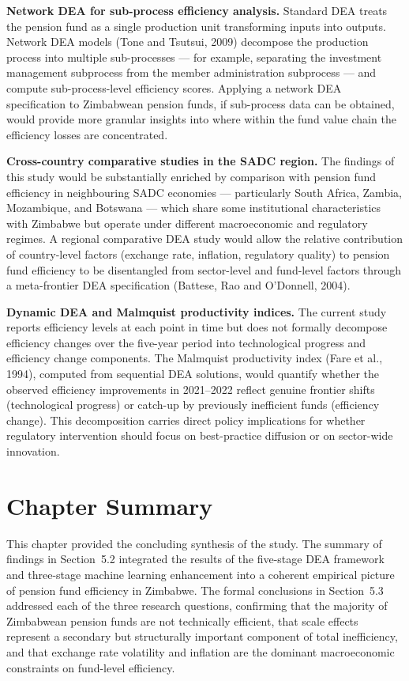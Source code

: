 \documentclass[12pt,a4paper]{article}
\begin{document}
\textbf{Network DEA for sub-process efficiency analysis.} Standard DEA treats the pension fund as a single production unit transforming inputs into outputs. Network DEA models (Tone and Tsutsui, 2009) decompose the production process into multiple sub-processes --- for example, separating the investment management subprocess from the member administration subprocess --- and compute sub-process-level efficiency scores. Applying a network DEA specification to Zimbabwean pension funds, if sub-process data can be obtained, would provide more granular insights into where within the fund value chain the efficiency losses are concentrated.

\textbf{Cross-country comparative studies in the SADC region.} The findings of this study would be substantially enriched by comparison with pension fund efficiency in neighbouring SADC economies --- particularly South Africa, Zambia, Mozambique, and Botswana --- which share some institutional characteristics with Zimbabwe but operate under different macroeconomic and regulatory regimes. A regional comparative DEA study would allow the relative contribution of country-level factors (exchange rate, inflation, regulatory quality) to pension fund efficiency to be disentangled from sector-level and fund-level factors through a meta-frontier DEA specification (Battese, Rao and O'Donnell, 2004).

\textbf{Dynamic DEA and Malmquist productivity indices.} The current study reports efficiency levels at each point in time but does not formally decompose efficiency changes over the five-year period into technological progress and efficiency change components. The Malmquist productivity index (Fare et al., 1994), computed from sequential DEA solutions, would quantify whether the observed efficiency improvements in 2021--2022 reflect genuine frontier shifts (technological progress) or catch-up by previously inefficient funds (efficiency change). This decomposition carries direct policy implications for whether regulatory intervention should focus on best-practice diffusion or on sector-wide innovation.

\section{Chapter Summary}

This chapter provided the concluding synthesis of the study. The summary of findings in Section~5.2 integrated the results of the five-stage DEA framework and three-stage machine learning enhancement into a coherent empirical picture of pension fund efficiency in Zimbabwe. The formal conclusions in Section~5.3 addressed each of the three research questions, confirming that the majority of Zimbabwean pension funds are not technically efficient, that scale effects represent a secondary but structurally important component of total inefficiency, and that exchange rate volatility and inflation are the dominant macroeconomic constraints on fund-level efficiency.
\end{document}

